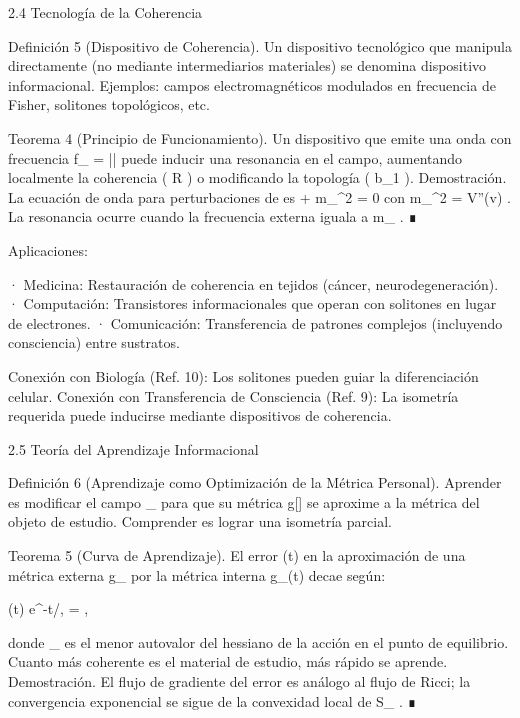 \documentclass[12pt,a4paper]{book}
\begin{document}
2.4 Tecnología de la Coherencia

Definición 5 (Dispositivo de Coherencia). Un dispositivo tecnológico que manipula  \rho  directamente (no mediante intermediarios materiales) se denomina dispositivo informacional. Ejemplos: campos electromagnéticos modulados en frecuencia de Fisher, solitones topológicos, etc.

Teorema 4 (Principio de Funcionamiento). Un dispositivo que emite una onda con frecuencia  f_{} =  |\nabla \ln \rho|  puede inducir una resonancia en el campo, aumentando localmente la coherencia ( R ) o modificando la topología ( b_1 ).
Demostración. La ecuación de onda para perturbaciones de  \rho  es  \square \delta\rho + m_{}^2 \delta\rho = 0  con  m_{}^2 = V''(v) . La resonancia ocurre cuando la frecuencia externa iguala a  m_{} . ∎

Aplicaciones:

· Medicina: Restauración de coherencia en tejidos (cáncer, neurodegeneración).
· Computación: Transistores informacionales que operan con solitones en lugar de electrones.
· Comunicación: Transferencia de patrones complejos (incluyendo consciencia) entre sustratos.

Conexión con Biología (Ref. 10): Los solitones pueden guiar la diferenciación celular.
Conexión con Transferencia de Consciencia (Ref. 9): La isometría requerida puede inducirse mediante dispositivos de coherencia.

2.5 Teoría del Aprendizaje Informacional

Definición 6 (Aprendizaje como Optimización de la Métrica Personal). Aprender es modificar el campo  \rho_{}  para que su métrica  g[\rho]  se aproxime a la métrica del objeto de estudio. Comprender es lograr una isometría parcial.

Teorema 5 (Curva de Aprendizaje). El error  \epsilon(t)  en la aproximación de una métrica externa  g_{}  por la métrica interna  g_{}(t)  decae según:

\epsilon(t) \propto e^{-t/\tau}, \quad \tau = ,

donde  \lambda_{\min}  es el menor autovalor del hessiano de la acción en el punto de equilibrio. Cuanto más coherente es el material de estudio, más rápido se aprende.
Demostración. El flujo de gradiente del error es análogo al flujo de Ricci; la convergencia exponencial se sigue de la convexidad local de  S_{} . ∎
\end{document}
